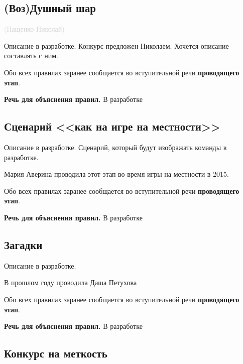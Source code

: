 \documentclass[a4paper, 14pt]{extarticle}
\theoremstyle{definition}
\begin{document}
\subsection{(Воз)Душный шар}
\textcolor{lightgray}{(Пащенко Николай)}
\par Описание в разработке. Конкурс предложен Николаем. Хочется описание составлять с ним.

\par 

\par Обо всех правилах заранее сообщается во вступительной речи \textbf{проводящего этап}.

\par \textbf{Речь для объяснения правил.} В разработке



\subsection{Сценарий <<как на игре на местности>>}

\par Описание в разработке. Сценарий, который будут изображать команды в разработке.

\par Мария Аверина проводила этот этап во время игры на местности в 2015.

\par Обо всех правилах заранее сообщается во вступительной речи \textbf{проводящего этап}.

\par \textbf{Речь для объяснения правил.} В разработке



\subsection{Загадки}

\par Описание в разработке.

\par В прошлом году проводила Даша Петухова

\par Обо всех правилах заранее сообщается во вступительной речи \textbf{проводящего этап}.

\par \textbf{Речь для объяснения правил.} В разработке



\subsection{Конкурс на меткость}
\end{document}
